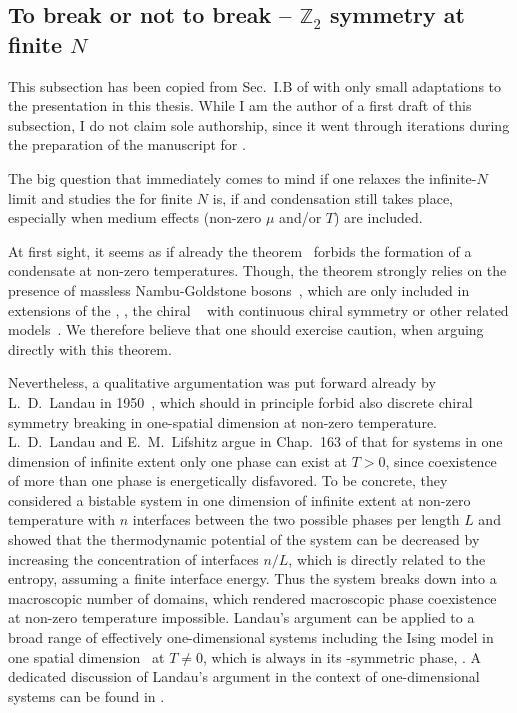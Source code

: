 \subsection{To break or not to break -- \texorpdfstring{$\mathds{Z}_2$}{Z2} symmetry at finite \texorpdfstring{$N$}{N}}\label{subsec:z2breaking}
\begin{disclaimer}
	This subsection has been copied from Sec.~I.B of  with only small adaptations to the presentation in this thesis.
	While I am the author of a first draft of this subsection, I do not claim sole authorship, since it went through iterations during the preparation of the manuscript for .
\end{disclaimer}
The big question that immediately comes to mind if one relaxes the infinite-$N$ limit and studies the \gnm{} for finite $N$ is, if \ssb{} and condensation still takes place, especially when medium effects (non-zero $\mu$ and/or $T$) are included.

At first sight, it seems as if already the  theorem~\cite{Mermin:1966,Hohenberg:1967,Coleman:1973ci} forbids the formation of a condensate at non-zero temperatures. Though, the theorem strongly relies on the presence of massless Nambu-Goldstone bosons~\cite{Nambu:1960tm,Goldstone:1961eq,Goldstone:1962es}, which are only included in extensions of the \gnm{}, \eg{}, the chiral \gnm{}~\cite{Schon:2000qy,Basar:2009fg,Furuya:1982fh} with continuous chiral symmetry or other related models~\cite{Witten:1978qu,Rosenstein:1990nm}. We therefore believe that one should exercise caution, when arguing directly with this theorem.

Nevertheless, a qualitative argumentation was put forward already by L.~D.~Landau in 1950~\cite{Landau:1980mil}, which should in principle forbid also discrete chiral symmetry breaking in one-spatial dimension at non-zero temperature. L.~D.~Landau and E.~M.~Lifshitz argue in Chap.~163 of  that for systems in one dimension of infinite extent only one phase can exist at $T>0$, since coexistence of more than one phase is energetically disfavored. To be concrete, they considered a bistable system in one dimension of infinite extent at non-zero temperature with $n$ interfaces between the two possible phases per length $L$ and showed that the thermodynamic potential of the system can be decreased by increasing the concentration of interfaces $n/L$, which is directly related to the entropy, assuming a finite interface energy. Thus the system breaks down into a macroscopic number of domains, which rendered macroscopic phase coexistence at non-zero temperature impossible. Landau's argument can be applied to a broad range of effectively one-dimensional systems including the Ising model in one spatial dimension~\cite{Ising:1925em} at $T \neq 0$, which is always in its \ZII{}-symmetric phase, \cf{} . A dedicated discussion of Landau's argument in the context of one-dimensional systems can be found in .

